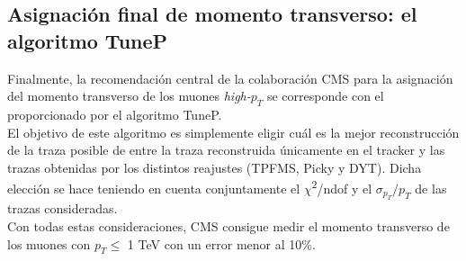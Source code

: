 \subsection{Asignaci\'on final de momento transverso: el algoritmo TuneP}\label{sec:TuneP}

Finalmente, la recomendaci\'on central de la colaboraci\'on CMS para la asignaci\'on del momento transverso de los muones \textit{high-$p_{T}$} se corresponde con el proporcionado por el algoritmo TuneP. \\
 El objetivo de este algoritmo es simplemente eligir cu\'al es la mejor reconstrucci\'on de la traza posible de entre la traza reconstruida \'unicamente en el tracker y las trazas obtenidas por los distintos reajustes (TPFMS, Picky y DYT). Dicha elecci\'on se hace teniendo en cuenta conjuntamente el $\chi$\textsuperscript{2}/ndof y el $\sigma_{p_{T}}/p_{T}$ de las trazas consideradas. \\

Con todas estas consideraciones, CMS consigue medir el momento transverso de los muones con $p_{T} \leq$ 1 TeV con un error menor al 10\%.
